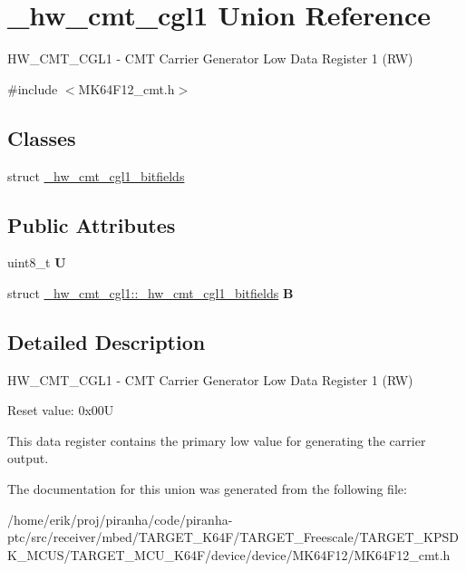 \hypertarget{union__hw__cmt__cgl1}{}\section{\+\_\+hw\+\_\+cmt\+\_\+cgl1 Union Reference}
\label{union__hw__cmt__cgl1}


H\+W\+\_\+\+C\+M\+T\+\_\+\+C\+G\+L1 -\/ C\+MT Carrier Generator Low Data Register 1 (RW)  




{\ttfamily \#include $<$M\+K64\+F12\+\_\+cmt.\+h$>$}

\subsection*{Classes}
\begin{DoxyCompactItemize}
\item 
struct \hyperlink{struct__hw__cmt__cgl1_1_1__hw__cmt__cgl1__bitfields}{\+\_\+hw\+\_\+cmt\+\_\+cgl1\+\_\+bitfields}
\end{DoxyCompactItemize}
\subsection*{Public Attributes}
\begin{DoxyCompactItemize}
\item 
uint8\+\_\+t {\bfseries U}\hypertarget{union__hw__cmt__cgl1_a4ed63f67a291d44a7abc2330f0ed227e}{}\label{union__hw__cmt__cgl1_a4ed63f67a291d44a7abc2330f0ed227e}

\item 
struct \hyperlink{struct__hw__cmt__cgl1_1_1__hw__cmt__cgl1__bitfields}{\+\_\+hw\+\_\+cmt\+\_\+cgl1\+::\+\_\+hw\+\_\+cmt\+\_\+cgl1\+\_\+bitfields} {\bfseries B}\hypertarget{union__hw__cmt__cgl1_a65323fcc7613812869fcaece6ebeb08a}{}\label{union__hw__cmt__cgl1_a65323fcc7613812869fcaece6ebeb08a}

\end{DoxyCompactItemize}


\subsection{Detailed Description}
H\+W\+\_\+\+C\+M\+T\+\_\+\+C\+G\+L1 -\/ C\+MT Carrier Generator Low Data Register 1 (RW) 

Reset value\+: 0x00U

This data register contains the primary low value for generating the carrier output. 

The documentation for this union was generated from the following file\+:\begin{DoxyCompactItemize}
\item 
/home/erik/proj/piranha/code/piranha-\/ptc/src/receiver/mbed/\+T\+A\+R\+G\+E\+T\+\_\+\+K64\+F/\+T\+A\+R\+G\+E\+T\+\_\+\+Freescale/\+T\+A\+R\+G\+E\+T\+\_\+\+K\+P\+S\+D\+K\+\_\+\+M\+C\+U\+S/\+T\+A\+R\+G\+E\+T\+\_\+\+M\+C\+U\+\_\+\+K64\+F/device/device/\+M\+K64\+F12/M\+K64\+F12\+\_\+cmt.\+h\end{DoxyCompactItemize}
